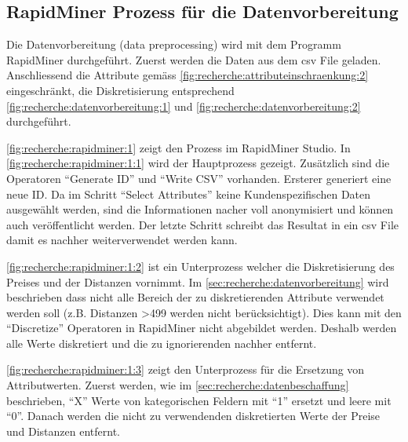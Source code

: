 
\subsection{RapidMiner Prozess für die Datenvorbereitung}
\label{sec:konzept:rapidminer}

Die Datenvorbereitung (data preprocessing) wird mit dem Programm RapidMiner durchgeführt.
Zuerst werden die Daten aus dem \gls{csv} File geladen. Anschliessend die Attribute gemäss \cref{fig:recherche:attributeinschraenkung:2} eingeschränkt, die Diskretisierung entsprechend \cref{fig:recherche:datenvorbereitung:1} und \ref{fig:recherche:datenvorbereitung:2} durchgeführt.

\cref{fig:recherche:rapidminer:1} zeigt den Prozess im RapidMiner Studio. In \ref{fig:recherche:rapidminer:1:1} wird der Hauptprozess gezeigt. Zusätzlich sind die Operatoren "`Generate ID"' und "`Write CSV"' vorhanden. Ersterer generiert eine neue ID. Da im Schritt "`Select Attributes"' keine Kundenspezifischen Daten ausgewählt werden, sind die Informationen nacher voll anonymisiert und können auch veröffentlicht werden. Der letzte Schritt schreibt das Resultat in ein \gls{csv} File damit es nachher weiterverwendet werden kann.

\cref{fig:recherche:rapidminer:1:2} ist ein Unterprozess welcher die Diskretisierung des Preises und der Distanzen vornimmt. Im \cref{sec:recherche:datenvorbereitung} wird beschrieben dass nicht alle Bereich der zu diskretierenden Attribute verwendet werden soll (z.B. Distanzen >499 werden nicht berücksichtigt). Dies kann mit den "`Discretize"' Operatoren in RapidMiner nicht abgebildet werden. Deshalb werden alle Werte diskretiert und die zu ignorierenden nachher entfernt.

\cref{fig:recherche:rapidminer:1:3} zeigt den Unterprozess für die Ersetzung von Attributwerten. Zuerst werden, wie im \cref{sec:recherche:datenbeschaffung} beschrieben, "`X"' Werte von kategorischen Feldern mit "`1"' ersetzt und leere mit "`0"'. Danach werden die nicht zu verwendenden diskretierten Werte der Preise und Distanzen entfernt.

